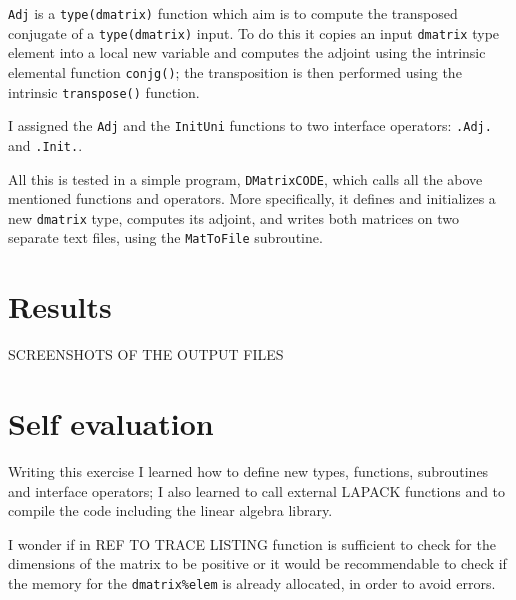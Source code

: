 \documentclass[a4paper]{article}
\begin{document}
\lstinline{Adj} is a \lstinline{type(dmatrix)} function which aim is to compute the transposed conjugate of a \lstinline{type(dmatrix)} input.
To do this it copies an input \lstinline{dmatrix} type element into a local new variable and computes the adjoint using the intrinsic elemental function \lstinline{conjg()}; the transposition is then performed using the intrinsic \lstinline{transpose()} function.

I assigned the \lstinline{Adj} and the \lstinline{InitUni} functions to two interface operators: \lstinline{.Adj.} and \lstinline{.Init.}.

All this is tested in a simple program, \lstinline{DMatrixCODE}, which calls all the above mentioned functions and operators.
More specifically, it defines and initializes a new \lstinline{dmatrix} type, computes its adjoint, and writes both matrices on two separate text files, using the \lstinline{MatToFile} subroutine.



\section*{Results}

SCREENSHOTS OF THE OUTPUT FILES

\section*{Self evaluation}
Writing this exercise I learned how to define new types, functions, subroutines and interface operators; I also learned to call external LAPACK functions and to compile the code including the linear algebra library.

I wonder if in REF TO TRACE LISTING function is sufficient to check for the dimensions of the matrix to be positive or it would be recommendable to check if the memory for the \lstinline{dmatrix%elem} is already allocated, in order to avoid errors.
\end{document}
